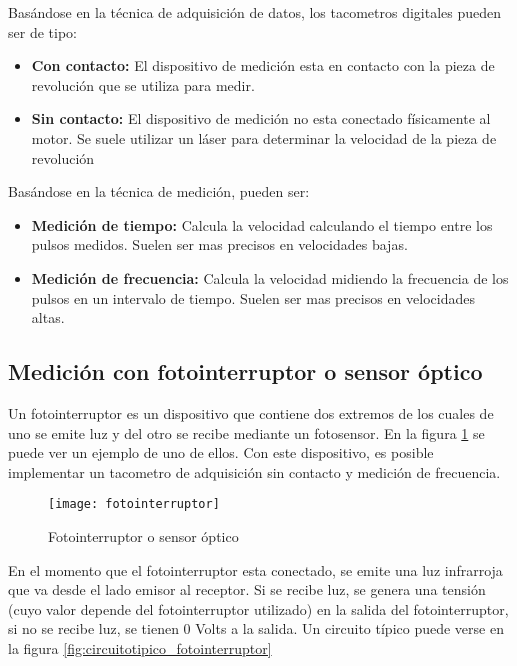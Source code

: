 Basándose en la técnica de adquisición de datos, los tacometros digitales pueden ser de tipo:

\begin{itemize}
	\item \textbf{Con contacto:} El dispositivo de medición esta en contacto con la pieza de revolución que se utiliza para medir. 
	\item \textbf{Sin contacto:} El dispositivo de medición no esta conectado físicamente al motor. Se suele utilizar un láser para determinar la velocidad de la pieza de revolución
\end{itemize}

Basándose en la técnica de medición, pueden ser:

\begin{itemize}
	\item \textbf{Medición de tiempo:} Calcula la velocidad calculando el tiempo entre los pulsos medidos. Suelen ser mas precisos en velocidades bajas.
	\item \textbf{Medición de frecuencia:} Calcula la velocidad midiendo la frecuencia de los pulsos en un intervalo de tiempo. Suelen ser mas precisos en velocidades altas.
\end{itemize}

\subsection{Medición con fotointerruptor o sensor óptico} %
\label{sub:medicion_con_fotointerruptor_o_sensor_optico}

Un fotointerruptor es un dispositivo que contiene dos extremos de los cuales de uno se emite luz y del otro se recibe mediante un fotosensor. En la figura \ref{fig:fotointerruptor} se puede ver un ejemplo de uno de ellos. Con este dispositivo, es posible implementar un tacometro de adquisición sin contacto y medición de frecuencia.\cite{slotted_sensor}

\begin{figure}[h]
  \centering
  \texttt{[image: fotointerruptor]}
  \caption{Fotointerruptor o sensor óptico}\label{fig:fotointerruptor}
\end{figure}

En el momento que el fotointerruptor esta conectado, se emite una luz infrarroja que va desde el lado emisor al receptor. Si se recibe luz, se genera una tensión (cuyo valor depende del fotointerruptor utilizado) en la salida del fotointerruptor, si no se recibe luz, se tienen 0 Volts a la salida. Un circuito típico puede verse en la figura \ref{fig:circuitotipico_fotointerruptor} \\

